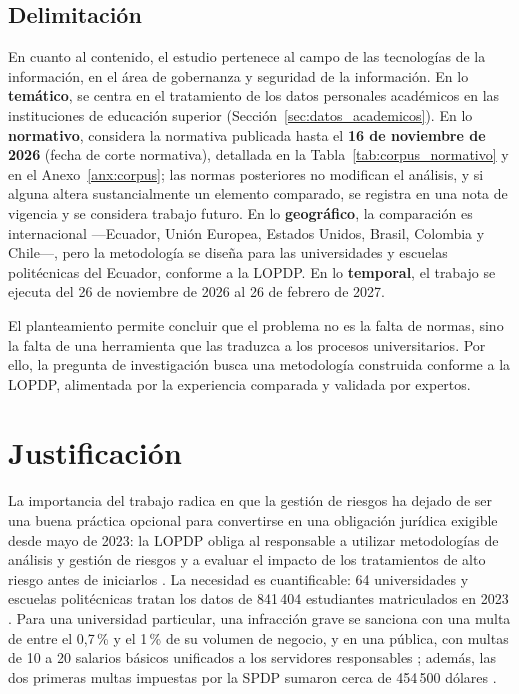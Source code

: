 \subsection{Delimitación}

En cuanto al contenido, el estudio pertenece al campo de las tecnologías de la información, en el área de gobernanza y seguridad de la información. En lo \textbf{temático}, se centra en el tratamiento de los datos personales académicos en las instituciones de educación superior (Sección~\ref{sec:datos_academicos}). En lo \textbf{normativo}, considera la normativa publicada hasta el \textbf{16 de noviembre de 2026} (fecha de corte normativa), detallada en la Tabla~\ref{tab:corpus_normativo} y en el Anexo~\ref{anx:corpus}; las normas posteriores no modifican el análisis, y si alguna altera sustancialmente un elemento comparado, se registra en una nota de vigencia y se considera trabajo futuro. En lo \textbf{geográfico}, la comparación es internacional ---Ecuador, Unión Europea, Estados Unidos, Brasil, Colombia y Chile---, pero la metodología se diseña para las universidades y escuelas politécnicas del Ecuador, conforme a la LOPDP. En lo \textbf{temporal}, el trabajo se ejecuta del 26 de noviembre de 2026 al 26 de febrero de 2027.

El planteamiento permite concluir que el problema no es la falta de normas, sino la falta de una herramienta que las traduzca a los procesos universitarios. Por ello, la pregunta de investigación busca una metodología construida conforme a la LOPDP, alimentada por la experiencia comparada y validada por expertos.

\section{Justificación}

La importancia del trabajo radica en que la gestión de riesgos ha dejado de ser una buena práctica opcional para convertirse en una obligación jurídica exigible desde mayo de 2023: la LOPDP obliga al responsable a utilizar metodologías de análisis y gestión de riesgos \cite[art.~47, num.~5]{lopdp2021} y a evaluar el impacto de los tratamientos de alto riesgo antes de iniciarlos \cite[art.~42]{lopdp2021}. La necesidad es cuantificable: 64 universidades y escuelas politécnicas \cite{ces2026estadisticas} tratan los datos de 841\,404 estudiantes matriculados en 2023 \cite{sumba2025economia}. Para una universidad particular, una infracción grave se sanciona con una multa de entre el 0,7\,\% y el 1\,\% de su volumen de negocio, y en una pública, con multas de 10 a 20 salarios básicos unificados a los servidores responsables \cite[art.~72]{lopdp2021}; además, las dos primeras multas impuestas por la SPDP sumaron cerca de 454\,500 dólares \cite{revelo2025sanciones}.

